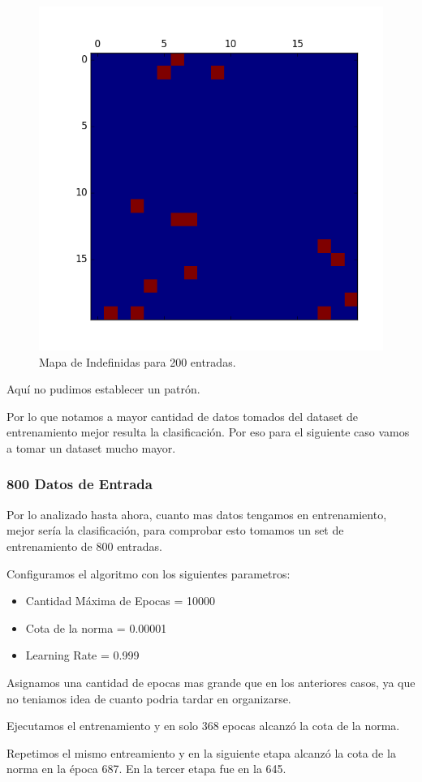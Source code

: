 \begin{figure}[H]
  \centering
  \includegraphics[width=0.5\columnwidth]{secciones/graficos/kohonen/mapaindefinidas200.png}
  \caption{Mapa de Indefinidas para 200 entradas.}
  \label{fig:mapa indefinidas 200}
\end{figure}

Aquí no pudimos establecer un patrón.

Por lo que notamos a mayor cantidad de datos tomados del dataset de entrenamiento
mejor resulta la clasificación. Por eso para el siguiente caso vamos a tomar un
dataset mucho mayor.


\subsubsection{800 Datos de Entrada}

Por lo analizado hasta ahora, cuanto mas datos tengamos en entrenamiento, mejor
sería la clasificación, para comprobar esto tomamos un set de entrenamiento
de 800 entradas.

Configuramos el algoritmo con los siguientes parametros:

\begin{itemize}
	\item Cantidad Máxima de Epocas = 10000
	\item Cota de la norma = 0.00001
	\item Learning Rate = 0.999
\end{itemize}


Asignamos una cantidad de epocas mas grande que en los anteriores casos, ya que
no teniamos idea de cuanto podria tardar en organizarse.

Ejecutamos el entrenamiento y en solo 368 epocas alcanzó la cota de la norma.

Repetimos el mismo entreamiento y en la siguiente etapa alcanzó la cota de la norma
en la época 687. En la tercer etapa fue en la 645.

